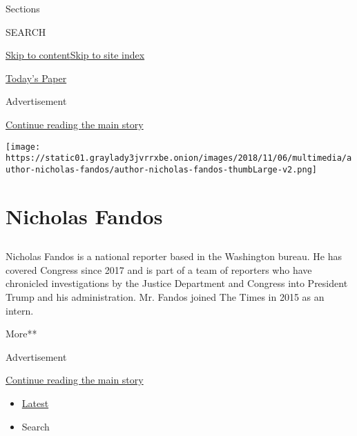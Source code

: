 Sections

SEARCH

\protect\hyperlink{site-content}{Skip to
content}\protect\hyperlink{site-index}{Skip to site index}

\href{https://myaccount.nytimes3xbfgragh.onion/auth/login?response_type=cookie\&client_id=vi}{}

\href{https://www.nytimes3xbfgragh.onion/section/todayspaper}{Today's
Paper}

Advertisement

\protect\hyperlink{after-top}{Continue reading the main story}

\texttt{[image: https://static01.graylady3jvrrxbe.onion/images/2018/11/06/multimedia/author-nicholas-fandos/author-nicholas-fandos-thumbLarge-v2.png]}

\hypertarget{nicholas-fandos}{%
\section{Nicholas Fandos}\label{nicholas-fandos}}

\hypertarget{section}{%
\subsection{}\label{section}}

Nicholas Fandos is a national reporter based in the Washington bureau.
He has covered Congress since 2017 and is part of a team of reporters
who have chronicled investigations by the Justice Department and
Congress into President Trump and his administration. Mr. Fandos joined
The Times in 2015 as an intern.

More**

Advertisement

\protect\hyperlink{after-mid1}{Continue reading the main story}

\begin{itemize}
\tightlist
\item
  \protect\hyperlink{stream-panel}{Latest}
\item
  Search
\end{itemize}

